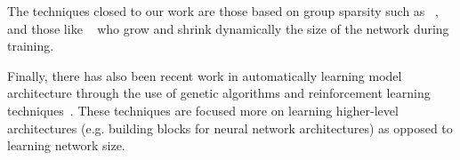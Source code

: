 The techniques closed to our work are those based on group sparsity such as
~\cite{Scardapane2017}, and those like ~\cite{Philipp} who grow and shrink
dynamically the size of the network during training.

Finally, there has also been recent work in automatically learning model
architecture through the use of genetic algorithms and reinforcement learning
techniques~\cite{DBLP:journals/corr/ZophL16, zoph2017learning}.  These
techniques are focused more on learning higher-level architectures (e.g.
building blocks for neural network architectures) as opposed to learning
network size.
